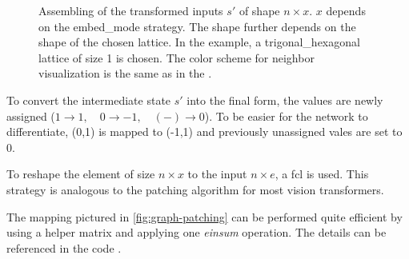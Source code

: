 \begin{figure}[htbp]
    \centering
    \caption{Assembling of the transformed inputs $s'$ of shape $n\times x$. $x$ depends on the embed\_mode strategy.
                The shape further depends on the shape of the chosen lattice. 
                In the example, a trigonal\_hexagonal lattice of size 1 is chosen.
                The color scheme for neighbor visualization is the same as in the .}
    \label{fig:graph-patching}
\end{figure}

To convert the intermediate state $s'$ into the final form, the values are newly assigned
($1 \rightarrow 1,\quad 0\rightarrow -1,\quad (-) \rightarrow 0$). 
To be easier for the network to differentiate, (0,1) is mapped to (-1,1) and previously unassigned vales are set to 0.

To reshape the element of size $n \times x$ to the input $n\times e$, a fcl is used.
This strategy is analogous to the patching algorithm for most vision transformers.

The mapping pictured in \autoref{fig:graph-patching} can be performed quite efficient by using a helper matrix and applying one \emph{einsum} operation.  
The details can be referenced in the code \cite{selfPhysics}.


